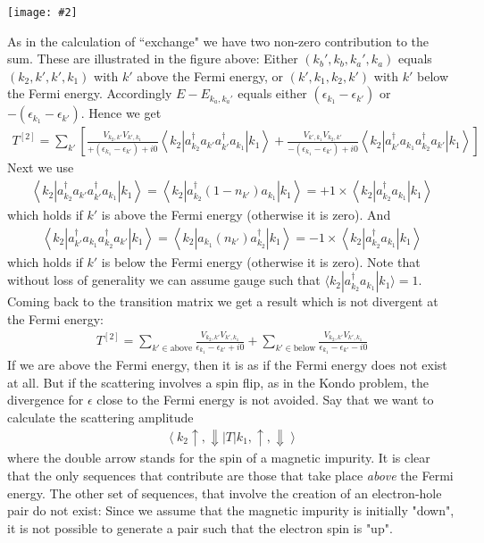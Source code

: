 \documentclass[onecolumn,fleqn]{revtex4}
\newcommand{\tbox}[1]{\text{#1}}
\newcommand{\putgraph}[2][0.30\hsize]{\texttt{[image: \#2]}}
\newcommand{\beq}{\begin{eqnarray}}
\newcommand{\eeq}{\end{eqnarray}}
\begin{document}
\begin{center}
\putgraph[0.6\hsize]{kondo}
\end{center}


As in the calculation of ``exchange" 
we have two non-zero contribution to the sum.
These are illustrated in the figure above:  
Either  $(k_b',k_b,k_a',k_a)$ equals 
$(k_2,k',k',k_1)$ with $k'$ above the Fermi 
energy, or $(k',k_1,k_2,k')$ with $k'$ below 
the Fermi energy. Accordingly $E-E_{k_a,k_a'}$ 
equals either ${(\epsilon_{k_1}-\epsilon_{k'})}$ 
or  ${-(\epsilon_{k_1}-\epsilon_{k'})}$. Hence we get
\beq
T^{[2]}
=  \sum_{k'}
\left[
\frac{ V_{k_2,k'} V_{k',k_1} }{+(\epsilon_{k_1}-\epsilon_{k'})+i0}
\left\langle k_{2} \left| 
a^{\dag}_{k_2}  a_{k'}
a^{\dag}_{k'}  a_{k_1}
\right|k_{1}\right\rangle
+
\frac{ V_{k',k_1} V_{k_2,k'} }{-(\epsilon_{k_1}-\epsilon_{k'})+i0}
\left\langle k_{2} \left| 
a^{\dag}_{k'}  a_{k_1}
a^{\dag}_{k_2}  a_{k'}
\right|k_{1}\right\rangle
\right]
\eeq
Next we use 
\beq 
\left\langle k_{2} \left| 
a^{\dag}_{k_2}  a_{k'}
a^{\dag}_{k'}  a_{k_1}
\right|k_{1}\right\rangle 
=
\left\langle k_{2} \left| 
a^{\dag}_{k_2} (1-n_{k'}) a_{k_1}
\right|k_{1}\right\rangle 
= 
+1 \times  
\left\langle k_{2} \left| 
a^{\dag}_{k_2}a_{k_1}
\right|k_{1}\right\rangle 
\eeq
which holds if $k'$ is above the Fermi energy 
(otherwise it is zero).  And 
\beq 
\left\langle k_{2} \left| 
a^{\dag}_{k'}  a_{k_1}
a^{\dag}_{k_2}  a_{k'}
\right|k_{1}\right\rangle
= 
\left\langle k_{2} \left| 
a_{k_1} ( n_{k'} ) a^{\dag}_{k_2} 
\right|k_{1}\right\rangle
= 
-1 \times 
\left\langle k_{2} \left| 
a^{\dag}_{k_2}a_{k_1}
\right|k_{1}\right\rangle 
\eeq
which holds if $k'$ is below the Fermi energy 
(otherwise it is zero). Note that without 
loss of generality we can assume gauge 
such that ${\langle k_{2}| a^{\dag}_{k_2}a_{k_1}|k_{1}\rangle =1}$.
Coming back to the transition matrix we   
get a result which is not divergent at the Fermi energy: 
\beq
T^{[2]} = 
\sum_{k'\in \tbox{above}}
\frac{ V_{k_2,k'} V_{k',k_1} }{\epsilon_{k_1}-\epsilon_{k'}+i0}
+ 
\sum_{k'\in \tbox{below}}
\frac{ V_{k_2,k'} V_{k',k_1} }{\epsilon_{k_1}-\epsilon_{k'}-i0}
\eeq
If we are above the Fermi energy, 
then it is as if the Fermi energy does not exist at all. 
But if the scattering involves a spin flip, 
as in the Kondo problem, 
the divergence for $\epsilon$ close to the Fermi energy 
is not avoided. Say that we want to calculate 
the scattering amplitude   
\beq
\left\langle k_{2} \uparrow,\Downarrow\left|T\right|k_{1},\uparrow,\Downarrow\right\rangle
\eeq
where the double arrow stands for the spin of 
a magnetic impurity. It is clear that the only 
sequences that contribute are those that 
take place {\em above} the Fermi energy. 
The other set of sequences, that involve 
the creation of an electron-hole pair do not exist: 
Since we assume that the magnetic impurity 
is initially "down", it is not possible to 
generate a pair such that the electron spin is "up". 
\end{document}
